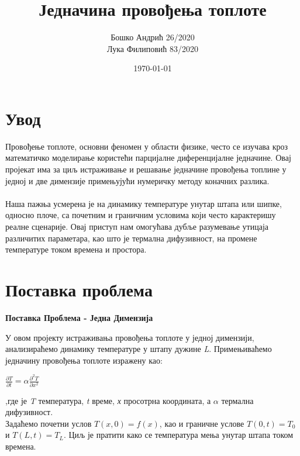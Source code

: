 \documentclass[a4paper,12pt]{article}
\title{Једначина провођења топлоте}
\author{Бошко Андрић 26/2020 \\ Лука Филиповић 83/2020}
\date{\today}
\begin{document}
	
	\maketitle
	\tableofcontents
	
	\pagebreak
	
	\section{Увод}
	
	Провођење топлоте, основни феномен у области физике, често се изучава кроз математичко моделирање користећи парцијалне диференцијалне једначине. Овај пројекат има за циљ истраживање и решавање једначине провођења топлине у једној и две димензије примењујући нумеричку методу коначних разлика.
	\\
	\\
	Наша пажња усмерена је на динамику температуре унутар штапа или шипке, односно плоче, са почетним и граничним условима који често карактеришу реалне сценарије. Овај приступ нам омогућава дубље разумевање утицаја различитих параметара, као што је термална дифузивност, на промене температуре током времена и простора.
	
	
	\section{Поставка проблема}
	
	\begin{center}
		\textbf{Поставка Проблема - Једна Димензија}
	\end{center}
	
	У овом пројекту истраживања провођења топлоте у једној димензији, анализираћемо динамику температуре у штапу дужине \textit{L}. Примењиваћемо једначину провођења топлоте изражену као:\\\begin{center}
		$ \frac{\partial T}{\partial t} = \alpha \frac{\partial^2 T}{\partial x^2} $
	\end{center} ,где је \textit{T} температура, \textit{t} време, \textit{х} просотрна координата, а \textit{$\alpha$} термална дифузивност.\\ Задаћемо почетни услов $ T(x,0) = f(x) $, као и граничне услове $ T(0,t) = {T}_{0} $ и $ T(L,t) = {T}_{L} $. Циљ је пратити како се температура мења унутар штапа током времена.
	
\end{document}

